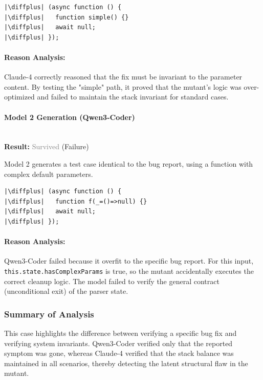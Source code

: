 \documentclass[11pt]{article}
\newcommand{\diffplus}{\textcolor{green!70!black}{+}} %
\begin{document}
\begin{verbatim}
|\diffplus| (async function () {
|\diffplus|   function simple() {} 
|\diffplus|   await null; 
|\diffplus| });
\end{verbatim}

\paragraph{Reason Analysis:}
Claude-4 correctly reasoned that the fix must be invariant to the parameter content. By testing the "simple" path, it proved that the mutant's logic was over-optimized and failed to maintain the stack invariant for standard cases.

\vspace{1em}

\paragraph{Model 2 Generation (Qwen3-Coder)}
\mbox{} \\
\textbf{Result:} \textcolor{gray}{Survived} (Failure)

Model 2 generates a test case identical to the bug report, using a function with complex default parameters.

\begin{verbatim}
|\diffplus| (async function () {
|\diffplus|   function f(_=()=>null) {}
|\diffplus|   await null;
|\diffplus| });
\end{verbatim}

\paragraph{Reason Analysis:}
Qwen3-Coder failed because it overfit to the specific bug report. For this input, \texttt{this.state.hasComplexParams} is true, so the mutant accidentally executes the correct cleanup logic. The model failed to verify the general contract (unconditional exit) of the parser state.

\subsubsection{Summary of Analysis}
This case highlights the difference between verifying a specific bug fix and verifying system invariants. Qwen3-Coder verified only that the reported symptom was gone, whereas Claude-4 verified that the stack balance was maintained in all scenarios, thereby detecting the latent structural flaw in the mutant.
\end{document}
